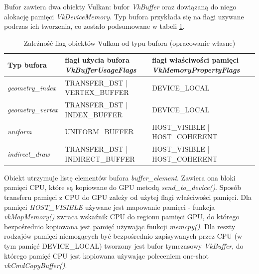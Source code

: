 Bufor zawiera dwa obiekty Vulkan: bufor \textit{VkBuffer} oraz dowiązaną do niego alokację pamięci \textit{VkDeviceMemory}.
Typ bufora przykłada się na flagi uzywane podczas ich tworzenia, co zostało podsumowane w tabeli \ref{params_buffer}.
\begin{table}[!htr]
	\centering
	\begin{tabular}{ |p{3cm}||>{\RaggedRight}p{4cm}|>{\RaggedRight}p{4cm}|}
		\hline
		Typ bufora & flagi użycia bufora \mbox{\textit{VkBufferUsageFlags}} & flagi właściwości pamięci \textit{VkMemoryPropertyFlags} \\
		\hline \hline
		\textit{geometry\_index} & \mbox{TRANSFER\_DST} | \mbox{VERTEX\_BUFFER} & DEVICE\_LOCAL \\
		\hline 
		\textit{geometry\_vertex} & \mbox{TRANSFER\_DST} | \mbox{INDEX\_BUFFER} & DEVICE\_LOCAL \\
		\hline 
		\textit{uniform} & \mbox{UNIFORM\_BUFFER} &  \mbox{HOST\_VISIBLE} | \mbox{HOST\_COHERENT} \\
		\hline 
		\textit{indirect\_draw} & \mbox{TRANSFER\_DST} | \mbox{INDIRECT\_BUFFER} &  \mbox{HOST\_VISIBLE} | \mbox{HOST\_COHERENT}\\
		\hline
	\end{tabular}
	\caption{Zależność flag obiektów Vulkan od typu bufora (opracowanie własne)} 
	\label{params_buffer}
\end{table}

Obiekt utrzymuje listę elementów bufora \textit{buffer\_element}. Zawiera ona bloki pamięci CPU, które są kopiowane do GPU metodą \textit{send\_to\_device()}.
Sposób transferu pamięci z CPU do GPU zależy od użytej flagi właściwości pamięci.
Dla pamięci \textit{HOST\_VISIBLE} używane jest mapowanie pamięci - funkcja \textit{vkMapMemory()} zwraca wskaźnik CPU do regionu pamięci GPU, do którego bezpośrednio kopiowana jest pamięć używając fnukcji \textit{memcpy()}.
Dla reszty rodzajów pamięci niemogących być bezpośrednio zapisywanych przez CPU (w tym pamięć DEVICE\_LOCAL) tworzony jest bufor tymczasowy \textit{VkBuffer}, do którego pamięć CPU jest kopiowana używając poleceniem one-shot \textit{vkCmdCopyBuffer()}.


